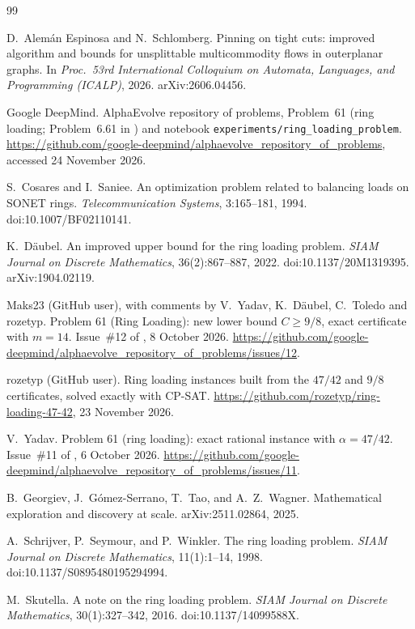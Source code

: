\documentclass[11pt]{article}
\theoremstyle{plain}
\theoremstyle{definition}
\theoremstyle{remark}
\begin{document}
\begin{thebibliography}{99}\small

D.~Alemán Espinosa and N.~Schlomberg.
\newblock Pinning on tight cuts: improved algorithm and bounds for unsplittable multicommodity flows in outerplanar graphs.
\newblock In \emph{Proc.\ 53rd International Colloquium on Automata, Languages, and Programming (ICALP)}, 2026. arXiv:2606.04456.

Google DeepMind.
\newblock AlphaEvolve repository of problems, Problem~61 (ring loading; Problem~6.61 in \cite{GGTW25}) and notebook \texttt{experiments/ring\_loading\_problem}.
\newblock \url{https://github.com/google-deepmind/alphaevolve_repository_of_problems}, accessed 24 November 2026.

S.~Cosares and I.~Saniee.
\newblock An optimization problem related to balancing loads on {SONET} rings.
\newblock \emph{Telecommunication Systems}, 3:165--181, 1994. doi:10.1007/BF02110141.

K.~Däubel.
\newblock An improved upper bound for the ring loading problem.
\newblock \emph{SIAM Journal on Discrete Mathematics}, 36(2):867--887, 2022. doi:10.1137/20M1319395. arXiv:1904.02119.

Maks23 (GitHub user), with comments by V.~Yadav, K.~Däubel, C.~Toledo and rozetyp.
\newblock Problem 61 (Ring Loading): new lower bound $C\ge9/8$, exact certificate with $m=14$.
\newblock Issue~\#12 of \cite{AERepo}, 8 October 2026. \url{https://github.com/google-deepmind/alphaevolve_repository_of_problems/issues/12}.

rozetyp (GitHub user).
\newblock Ring loading instances built from the $47/42$ and $9/8$ certificates, solved exactly with CP-SAT.
\newblock \url{https://github.com/rozetyp/ring-loading-47-42}, 23 November 2026.

V.~Yadav.
\newblock Problem 61 (ring loading): exact rational instance with $\alpha=47/42$.
\newblock Issue~\#11 of \cite{AERepo}, 6 October 2026. \url{https://github.com/google-deepmind/alphaevolve_repository_of_problems/issues/11}.

B.~Georgiev, J.~Gómez-Serrano, T.~Tao, and A.~Z.~Wagner.
\newblock Mathematical exploration and discovery at scale.
\newblock arXiv:2511.02864, 2025.

A.~Schrijver, P.~Seymour, and P.~Winkler.
\newblock The ring loading problem.
\newblock \emph{SIAM Journal on Discrete Mathematics}, 11(1):1--14, 1998. doi:10.1137/S0895480195294994.

M.~Skutella.
\newblock A note on the ring loading problem.
\newblock \emph{SIAM Journal on Discrete Mathematics}, 30(1):327--342, 2016. doi:10.1137/14099588X.

\end{thebibliography}
\end{document}
